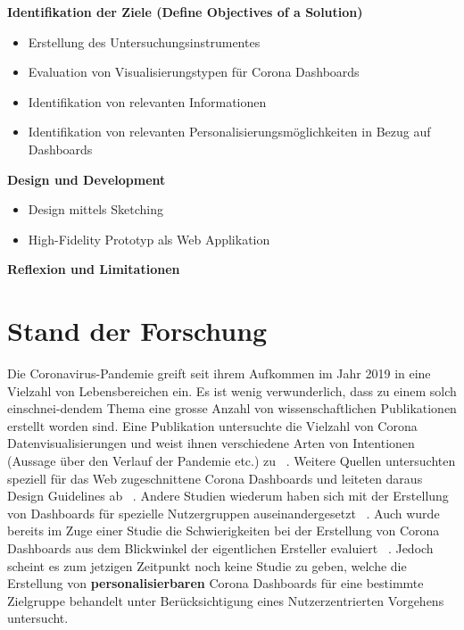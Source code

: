 \documentclass[12pt, oneside]{article}
\begin{document}
\textbf{Identifikation der Ziele (Define Objectives of a Solution)}
\begin{itemize}
    \item Erstellung des Untersuchungsinstrumentes
    \item Evaluation von Visualisierungstypen für Corona Dashboards
    \item Identifikation von relevanten Informationen
    \item Identifikation von relevanten Personalisierungsmöglichkeiten in Bezug auf Dashboards\\
\end{itemize}

\textbf{Design und Development}
\begin{itemize}
    \item Design mittels Sketching
    \item High-Fidelity Prototyp als Web Applikation\\
\end{itemize}

\textbf{Reflexion und Limitationen}

\clearpage
\section{Stand der Forschung}
Die Coronavirus-Pandemie greift seit ihrem Aufkommen im Jahr 2019 in eine Vielzahl von Lebensbereichen ein. Es ist wenig verwunderlich, dass zu einem solch einschnei-dendem Thema eine grosse Anzahl von wissenschaftlichen Publikationen erstellt worden sind. Eine Publikation untersuchte die Vielzahl von Corona Datenvisualisierungen und weist ihnen verschiedene Arten von Intentionen (Aussage über den Verlauf der Pandemie etc.) zu ~\citep{YixuanZhang.}. Weitere Quellen untersuchten speziell für das Web zugeschnittene Corona Dashboards und leiteten daraus Design Guidelines ab ~\citep{Ivankovic.2021}. Andere Studien wiederum haben sich mit der Erstellung von Dashboards für spezielle Nutzergruppen auseinandergesetzt ~\citep{Ivanov.2018}. Auch wurde bereits im Zuge einer Studie die Schwierigkeiten bei der Erstellung von Corona Dashboards aus dem Blickwinkel der eigentlichen Ersteller evaluiert ~\citep{Barbazza.}. Jedoch scheint es zum jetzigen Zeitpunkt noch keine Studie zu geben, welche die Erstellung von \textbf{personalisierbaren} Corona Dashboards für eine bestimmte Zielgruppe behandelt unter Berücksichtigung eines Nutzerzentrierten Vorgehens untersucht.

\clearpage


\end{document}
